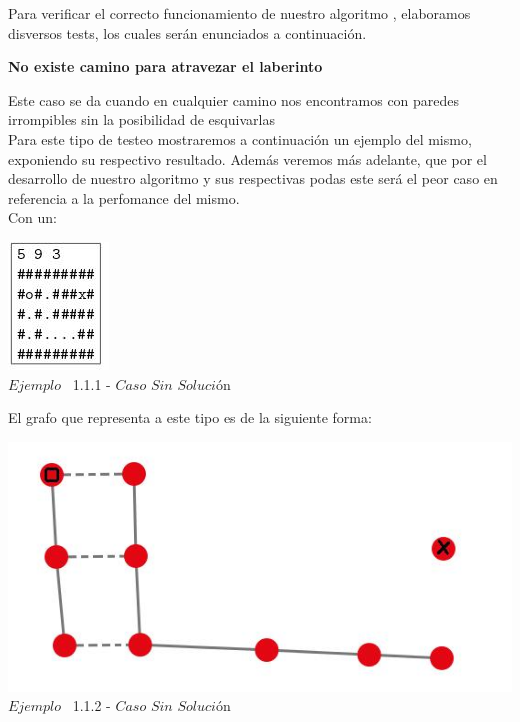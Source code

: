 \indent Para verificar el correcto funcionamiento de nuestro algoritmo , elaboramos disversos tests,
los cuales ser\'an enunciados a continuaci\'on.\\

\begin{center}
 \textbf{No existe camino para atravezar el laberinto}
\end{center}

Este caso se da cuando en cualquier camino nos encontramos con paredes irrompibles sin la posibilidad de esquivarlas\\

 Para este tipo de testeo mostraremos a continuaci\'on un ejemplo del mismo, exponiendo su respectivo resultado. Adem\'as veremos m\'as adelante, que por el desarrollo de nuestro algoritmo y sus respectivas podas este ser\'a el peor caso en referencia a la perfomance del mismo.\\
 
 Con un:
 
\vspace*{0.3cm} \vspace*{0.3cm}
  \begin{center}
 \includegraphics[scale=0.65]{./EJ1/ej1sinsolucion.jpeg}
\\{$Ejemplo$ \ 1.1.1 - $Caso$ $Sin$ $Soluci$\'on}
  \end{center}
  \vspace*{0.3cm}

El grafo que representa a este tipo es de la siguiente forma:\\

\vspace*{0.3cm} \vspace*{0.3cm}
  \begin{center}
 \includegraphics[scale=0.5]{./EJ1/ej1grafosinsolucion.jpeg}
 \\{$Ejemplo$ \ 1.1.2 - $Caso$ $Sin$ $Soluci$\'on}
  \end{center}
  \vspace*{0.3cm}

